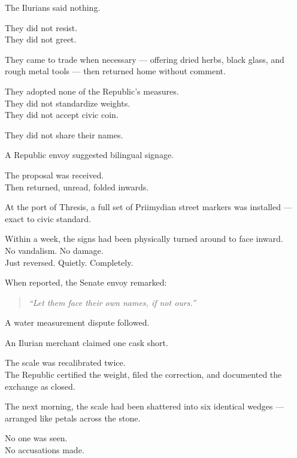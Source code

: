 \documentclass[9pt]{article}
\begin{document}
\vspace{1em}

The Ilurians said nothing.

They did not resist.\\
They did not greet.

They came to trade when necessary — offering dried herbs, black glass, and rough metal tools — then returned home without comment.

They adopted none of the Republic’s measures.\\
They did not standardize weights.\\
They did not accept civic coin.

They did not share their names.

\vspace{1em}

A Republic envoy suggested bilingual signage.

The proposal was received.\\
Then returned, unread, folded inwards.

\vspace{1em}

At the port of Thresis, a full set of Priimydian street markers was installed — exact to civic standard.

Within a week, the signs had been physically turned around to face inward.\\
No vandalism. No damage.\\
Just reversed. Quietly. Completely.

When reported, the Senate envoy remarked:

\begin{quote}
\textit{“Let them face their own names, if not ours.”}
\end{quote}

\vspace{1em}

A water measurement dispute followed.

An Ilurian merchant claimed one cask short.

The scale was recalibrated twice.\\
The Republic certified the weight, filed the correction, and documented the exchange as closed.

The next morning, the scale had been shattered into six identical wedges — arranged like petals across the stone.

No one was seen.\\
No accusations made.
\end{document}
